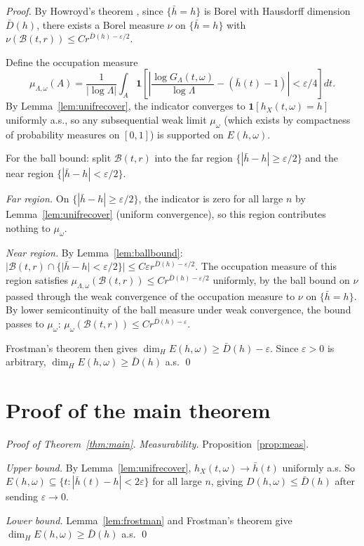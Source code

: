\documentclass[11pt,a4paper]{article}
\theoremstyle{definition}
\theoremstyle{remark}
\newcommand{\GL}{G_\Lambda}
\newcommand{\hb}{\bar{h}}
\begin{document}
\begin{proof}
By Howroyd's theorem \cite{howroyd1995}, since $\{\hb=h\}$ is Borel
with Hausdorff dimension $\bar D(h)$, there exists a Borel measure
$\nu$ on $\{\hb=h\}$ with $\nu(\mathcal{B}(t,r))\le Cr^{\bar D(h)-\varepsilon/2}$.

Define the occupation measure
\[
  \mu_{\Lambda,\omega}(A)
  = \frac{1}{|\log\Lambda|}
  \int_A\mathbf{1}\!\left[\left|\frac{\log\GL(t,\omega)}{\log\Lambda}
    -(\hb(t)-1)\right|<\varepsilon/4\right]dt.
\]
By Lemma~\ref{lem:unifrecover}, the indicator converges to
$\mathbf{1}[h_X(t,\omega)=h]$ uniformly a.s., so any subsequential
weak limit $\mu_\omega$ (which exists by compactness of probability
measures on $[0,1]$) is supported on $E(h,\omega)$.

For the ball bound: split $\mathcal{B}(t,r)$ into the far region
$\{|\hb-h|\ge\varepsilon/2\}$ and the near region
$\{|\hb-h|<\varepsilon/2\}$.

\emph{Far region.} On $\{|\hb-h|\ge\varepsilon/2\}$, the indicator
is zero for all large $n$ by Lemma~\ref{lem:unifrecover} (uniform
convergence), so this region contributes nothing to $\mu_\omega$.

\emph{Near region.} By Lemma~\ref{lem:ballbound}:
$|\mathcal{B}(t,r)\cap\{|\hb-h|<\varepsilon/2\}|\le C\varepsilon r^{\bar D(h)-\varepsilon/2}$.
The occupation measure of this region satisfies
$\mu_{\Lambda,\omega}(\mathcal{B}(t,r))\le Cr^{\bar D(h)-\varepsilon/2}$
uniformly, by the ball bound on $\nu$ passed through the weak
convergence of the occupation measure to $\nu$ on $\{\hb=h\}$.
By lower semicontinuity of the ball measure under weak convergence,
the bound passes to $\mu_\omega$:
$\mu_\omega(\mathcal{B}(t,r))\le Cr^{\bar D(h)-\varepsilon}$.

Frostman's theorem then gives $\dim_H E(h,\omega)\ge\bar D(h)-\varepsilon$.
Since $\varepsilon>0$ is arbitrary, $\dim_H E(h,\omega)\ge\bar D(h)$ a.s. \qed
\end{proof}

\section{Proof of the main theorem}

\begin{proof}[Proof of Theorem~\ref{thm:main}]
\emph{Measurability.} Proposition~\ref{prop:meas}.

\emph{Upper bound.} By Lemma~\ref{lem:unifrecover},
$h_X(t,\omega)\to\hb(t)$ uniformly a.s. So
$E(h,\omega)\subseteq\{t:|\hb(t)-h|<2\varepsilon\}$ for all large
$n$, giving $D(h,\omega)\le\bar D(h)$ after sending $\varepsilon\to0$.

\emph{Lower bound.} Lemma~\ref{lem:frostman} and Frostman's theorem
give $\dim_H E(h,\omega)\ge\bar D(h)$ a.s. \qed
\end{proof}
\end{document}

